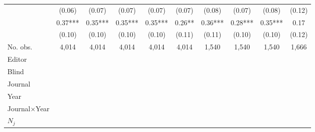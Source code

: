\begin{table}
\begin{threeparttable}
\begin{tabular}{p{3cm}S@{}S@{}S@{}S@{}S@{}S@{}S@{}S@{}S@{}}
                                          &      (0.06)   &      (0.07)   &      (0.07)   &      (0.07)   &      (0.07)   &      (0.08)   &      (0.07)   &      (0.08)   &      (0.12)   \\
               &        0.37***&        0.35***&        0.35***&        0.35***&        0.26** &        0.36***&        0.28***&        0.35***&        0.17   \\
                                          &      (0.10)   &      (0.10)   &      (0.10)   &      (0.10)   &      (0.11)   &      (0.11)   &      (0.10)   &      (0.10)   &      (0.12)   \\
            \midrule
            No. obs.                      &       4,014   &       4,014   &       4,014   &       4,014   &       4,014   &       1,540   &       1,540   &       1,540   &       1,666   \\
            \midrule
            Editor               &           {}   &           {}   &           {}   &           {}   &           {}   &           {}   &           {}   &           {}   &           {}   \\
            Blind                         &           {}   &           {}   &           {}   &           {}   &           {}   &           {}   &           {}   &           {}   &           {}   \\
            Journal                       &           {}   &           {}   &               &               &               &               &               &               &               \\
            Year                          &               &           {}   &               &               &               &               &               &               &               \\
            Journal\(\times\)Year                  &               &               &           {}   &           {}   &           {}   &           {}   &           {}   &           {}   &           {}   \\
            \(N_j\)                       &               &               &               &           {}   &           {}   &           {}   &           {}   &           {}   &           {}   \\

\end{tabular}
\end{threeparttable}
\end{table}
